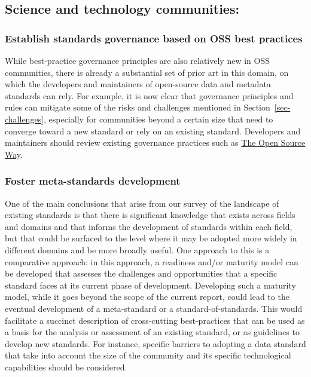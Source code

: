 \documentclass[
  number]{elsarticle}
\begin{document}
\subsection{Science and technology
communities:}\label{science-and-technology-communities}

\subsubsection{Establish standards governance based on OSS best
practices}\label{establish-standards-governance-based-on-oss-best-practices}

While best-practice governance principles are also relatively new in OSS
communities, there is already a substantial set of prior art in this
domain, on which the developers and maintainers of open-source data and
metadata standards can rely. For example, it is now clear that
governance principles and rules can mitigate some of the risks and
challenges mentioned in Section~\ref{sec-challenges}, especially for
communities beyond a certain size that need to converge toward a new
standard or rely on an existing standard. Developers and maintainers
should review existing governance practices such as
\href{https://www.theopensourceway.org/the_open_source_way-guidebook-2.0.html\#_project_and_community_governance}{The
Open Source Way}.

\subsubsection{Foster meta-standards
development}\label{foster-meta-standards-development}

One of the main conclusions that arise from our survey of the landscape
of existing standards is that there is significant knowledge that exists
across fields and domains and that informs the development of standards
within each field, but that could be surfaced to the level where it may
be adopted more widely in different domains and be more broadly useful.
One approach to this is a comparative approach: in this approach, a
readiness and/or maturity model can be developed that assesses the
challenges and opportunities that a specific standard faces at its
current phase of development. Developing such a maturity model, while it
goes beyond the scope of the current report, could lead to the eventual
development of a meta-standard or a standard-of-standards. This would
facilitate a succinct description of cross-cutting best-practices that
can be used as a basis for the analysis or assessment of an existing
standard, or as guidelines to develop new standards. For instance,
specific barriers to adopting a data standard that take into account the
size of the community and its specific technological capabilities should
be considered.
\end{document}
